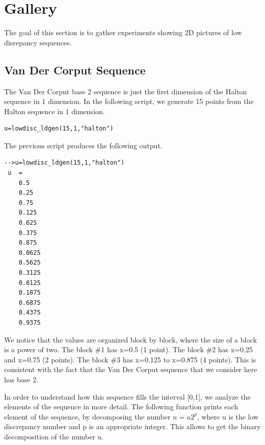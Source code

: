 %

    \chapter{Gallery}

The goal of this section is to gather experiments showing 
	  2D pictures of low disrepancy sequences.
\section{Van Der Corput Sequence}

      The Van Der Corput base 2 sequence is just the first dimension of 
	  the Halton sequence in 1 dimension. 
	  In the following script, we generate 15 points from the 
	  Halton sequence in 1 dimension.

\lstset{language=scilabscript}
\begin{lstlisting}
u=lowdisc_ldgen(15,1,"halton")
\end{lstlisting}

      The previous script produces the following output.

\lstset{language=scilabscript}
\begin{lstlisting}
-->u=lowdisc_ldgen(15,1,"halton")
 u  =
    0.5     
    0.25    
    0.75    
    0.125   
    0.625   
    0.375   
    0.875   
    0.0625  
    0.5625  
    0.3125  
    0.8125  
    0.1875  
    0.6875  
    0.4375  
    0.9375  
\end{lstlisting}

    
      We notice that the values are organized block by block, 
	  where the size of a block is a power of two. 
	  The block \#1 has x=0.5 (1 point). 
	  The block \#2 has x=0.25 and x=0.75 (2 points). 
	  The block \#3 has x=0.125 to x=0.875 (4 points). 
	  This is consistent with the fact that the Van Der Corput 
	  sequence that we consider here has base 2.
    

    
      In order to understand how this sequence fills the interval [0,1], 
	  we analyze the elements of the sequence in more detail. 
	  The following function prints each element of the sequence, 
	  by decomposing the number $n=u 2^p$, where u is the low discrepancy 
	  number and p is an appropriate integer. 
	  This allows to get the binary decomposition of the number u.
    

